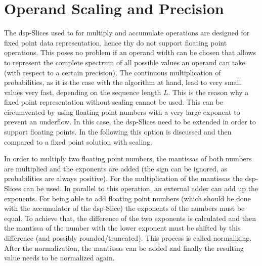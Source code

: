 \documentclass[mscthesis]{usiinfthesis}
\begin{document}
\section{Operand Scaling and Precision}
\label{ch:design_scaling}

The \gls{dsp}-Slices used to for multiply and accumulate operations are designed for
fixed point data representation, hence thy do not support floating point
operations. This poses no problem if an operand width can be chosen that allows
to represent the complete spectrum of all possible values an operand can take
(with respect to a certain precision). The continuous multiplication of
probabilities, as it is the case with the algorithm at hand, lead to very small
values very fast, depending on the sequence length $L$. This is the reason why
a fixed point representation without scaling cannot be used. This can be
circumvented by using floating point numbers with a very large exponent to
prevent an underflow. In this case, the \gls{dsp}-Slices need to be extended in order
to support floating points. In the following this option is discussed and then
compared to a fixed point solution with scaling.

In order to multiply two floating point numbers, the mantissas of both numbers
are multiplied and the exponents are added (the sign can be ignored, as
probabilities are always positive). For the multiplication of the mantissas the
\gls{dsp}-Slices can be used. In parallel to this operation, an external adder can
add up the exponents. For being able to add floating point numbers (which
should be done with the accumulator of the \gls{dsp}-Slice) the exponents of the
numbers must be equal. To achieve that, the difference of the two exponents is
calculated and then the mantissa of the number with the lower exponent must be
shifted by this difference (and possibly rounded/truncated). This process is
called normalizing. After the normalization, the mantissas can be added and
finally the resulting value needs to be normalized again.
\end{document}
